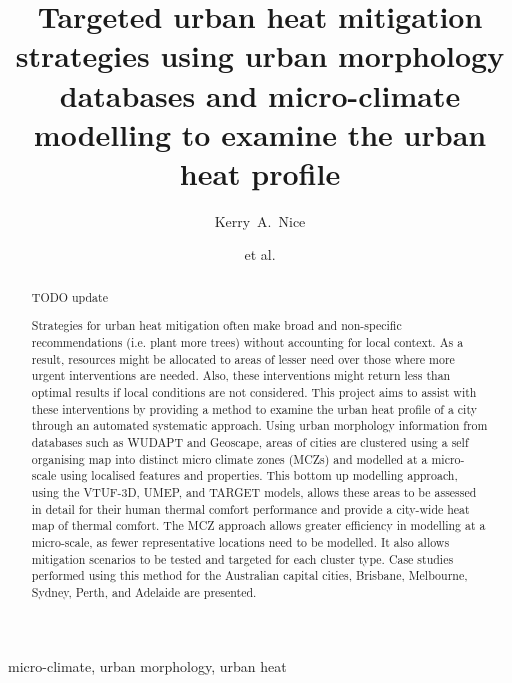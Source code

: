 \documentclass[final,3p,times,authoryear]{elsarticle}
\begin{document}

\title{Targeted urban heat mitigation strategies using urban morphology databases and micro-climate modelling to examine the urban heat profile}

\author[melb]{Kerry~A.~Nice}
\author[melb]{et al.}
\address[melb]{Transport, Health, and Urban Design Hub, Faculty of Architecture, Building, and Planning, University of Melbourne, Australia.}







\begin{abstract}
TODO update

Strategies for urban heat mitigation often make broad and non-specific recommendations (i.e. plant more trees) without accounting for local context. As a result, resources might be allocated to areas of lesser need over those where more urgent interventions are needed. Also, these interventions might return less than optimal results if local conditions are not considered. This project aims to assist with these interventions by providing a method to examine the urban heat profile of a city through an automated systematic approach. Using urban morphology information from databases such as WUDAPT and Geoscape, areas of cities are clustered using a self organising map into distinct micro climate zones (MCZs) and modelled at a micro-scale using localised features and properties. This bottom up modelling approach, using the VTUF-3D, UMEP, and TARGET models, allows these areas to be assessed in detail for their human thermal comfort performance and provide a city-wide heat map of thermal comfort. The MCZ approach allows greater efficiency in modelling at a micro-scale, as fewer representative locations need to be modelled. It also allows mitigation scenarios to be tested and targeted for each cluster type. Case studies performed using this method for the Australian capital cities, Brisbane, Melbourne, Sydney, Perth, and Adelaide are presented.
\end{abstract}

\begin{keyword}
micro-climate\sep 
urban morphology\sep
urban heat
\end{keyword}
\end{document}
